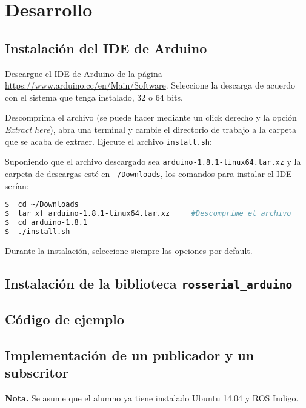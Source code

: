 \documentclass[letterpaper,12pt]{article}
\begin{document}
\section{Desarrollo}
\subsection{Instalación del IDE de Arduino}

Descargue el IDE de Arduino de la página \url{https://www.arduino.cc/en/Main/Software}. Seleccione la descarga de acuerdo con el sistema que tenga instalado, 32 o 64 bits. 

Descomprima el archivo (se puede hacer mediante un click derecho y la opción \textit{Extract here}), abra una terminal y cambie el directorio de trabajo a la carpeta que se acaba de extraer. Ejecute el archivo \texttt{install.sh}:

Suponiendo que el archivo descargado sea \texttt{arduino-1.8.1-linux64.tar.xz} y la carpeta de descargas esté en \texttt{~/Downloads}, los comandos para instalar el IDE serían:
\begin{lstlisting}[language=bash]
$  cd ~/Downloads      
$  tar xf arduino-1.8.1-linux64.tar.xz     #Descomprime el archivo
$  cd arduino-1.8.1
$  ./install.sh
\end{lstlisting}

Durante la instalación, seleccione siempre las opciones por default. 

\subsection{Instalación de la biblioteca \texttt{rosserial_arduino}}


\subsection{Código de ejemplo}

\subsection{Implementación de un publicador y un subscritor}

\textbf{Nota.} Se asume que el alumno ya tiene instalado Ubuntu 14.04 y ROS Indigo. 
\end{document}
